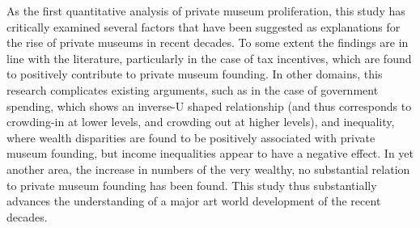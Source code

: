 \documentclass[11pt]{article}
\begin{document}
As the first quantitative analysis of private museum proliferation, this study has critically examined several factors that have been suggested as explanations for the rise of private museums in recent decades.
To some extent the findings are in line with the literature, particularly in the case of tax incentives, which are found to positively contribute to private museum founding.
In other domains, this research complicates existing arguments, such as in the case of government spending, which shows an inverse-U shaped relationship (and thus corresponds to crowding-in at lower levels, and crowding out at higher levels), and inequality, where wealth disparities are found to be positively associated with private museum founding, but income inequalities appear to have a negative effect. 
In yet another area, the increase in numbers of the very wealthy, no substantial relation to private museum founding has been found. 
This study thus substantially advances the understanding of a major art world development of the recent decades.
\end{document}
